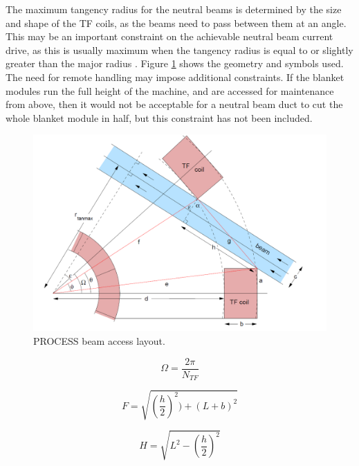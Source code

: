 \documentclass[hidelinks]{article}
\numberwithin{equation}{section}
\begin{document}
    The maximum tangency radius for the neutral beams is determined by the size and 
    shape of the TF coils, as the beams need to pass between them at an angle. This 
    may be an important constraint on the achievable neutral beam current drive, as 
    this is usually maximum when the tangency radius is equal to or slightly greater 
    than the major radius \cite{kovari2014, Surrey2012}. Figure \ref{fig: beam-access} 
    shows the geometry and symbols used.  The need for remote handling may impose 
    additional constraints.  If the blanket modules run the full height of the machine, 
    and are accessed for maintenance from above, then it would not be acceptable for a 
    neutral beam duct to cut the whole blanket module in half, but this constraint has 
    not been included.

    \begin{figure}[!t]
    \centering
    \includegraphics[scale=0.4]{archive/figures/beam_access.PNG}
    \caption{PROCESS beam access layout.} \label{fig: beam-access}
    \end{figure}

    \begin{equation}\label{eq: beam-a-omega}
        \Omega = \frac{2\pi}{N_{TF}}
    \end{equation}

    \begin{equation}\label{eq: beam-a-f}
        F = \sqrt{(\frac{h}{2})^2) + (L + b)^2 }
    \end{equation}

    \begin{equation}\label{eq: beam-a-h}
        H = \sqrt{ L^2 - (\frac{h}{2})^2 }
    \end{equation}
\end{document}
